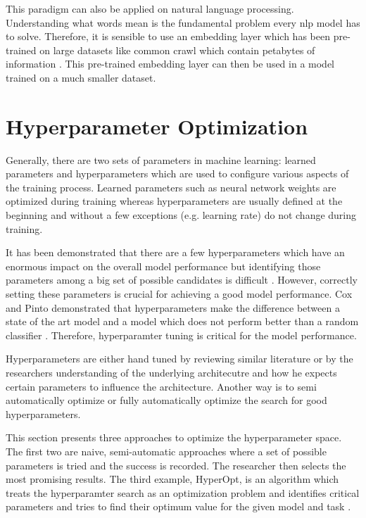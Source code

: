 This paradigm can also be applied on natural language processing. Understanding what words mean is the fundamental problem every \gls{nlp} model has to solve. Therefore, it is sensible to use an embedding layer which has been pre-trained on large datasets like common crawl which contain petabytes of information \cite{commonCrawl}. This pre-trained embedding layer can then be used in a model trained on a much smaller dataset.
 
\section{Hyperparameter Optimization}

Generally, there are two sets of parameters in machine learning: learned parameters and hyperparameters which are used to configure various aspects of the training process. Learned parameters such as neural network weights are optimized during training whereas hyperparameters are usually defined at the beginning and without a few exceptions {(e.g. learning rate)} do not change during training.

It has been demonstrated that there are a few hyperparameters which have an enormous impact on the overall model performance but identifying those parameters among a big set of possible candidates is difficult \cite{Bergstra2012a}. However, correctly setting these parameters is crucial for achieving a good model performance. Cox and Pinto demonstrated that hyperparameters make the difference between a state of the art model and a model which does not perform better than a random classifier \cite{Cox2011}. Therefore, hyperparamter tuning is critical for the model performance.

Hyperparameters are either hand tuned by reviewing similar literature or by the researchers understanding of the underlying architecutre and how he expects certain parameters to influence the architecture. Another way is to semi automatically optimize or fully automatically optimize the search for good hyperparameters.

This section presents three approaches to optimize the hyperparameter space. The first two are naive, semi-automatic approaches where a set of possible parameters is tried and the success is recorded. The researcher then selects the most promising results. The third example, HyperOpt, is an algorithm which treats the hyperparamter search as an optimization problem and identifies critical parameters and tries to find their optimum value for the given model and task \cite{Bergstra2013}.



